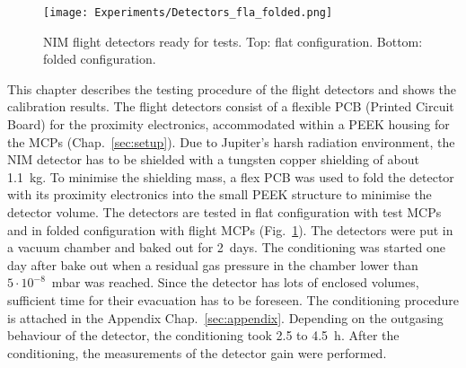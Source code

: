 	\begin{figure}[h] %
		\centering
		\texttt{[image: Experiments/Detectors\_fla\_folded.png]}
		\caption{NIM flight detectors ready for tests. Top: flat configuration. Bottom: folded configuration.}
		\label{fig:DetFlatFolded}
	\end{figure}
	This chapter describes the testing procedure of the flight detectors and shows the calibration results. The flight detectors consist of a flexible PCB (Printed Circuit Board) for the proximity electronics, accommodated within a PEEK housing for the MCPs (Chap.~\ref{sec:setup}). Due to Jupiter's harsh radiation environment, the NIM detector has to be shielded with a tungsten copper shielding of about 1.1~kg. To minimise the shielding mass, a flex PCB was used to fold the detector with its proximity electronics into the small PEEK structure to minimise the detector volume. The detectors are tested in flat configuration with test MCPs and in folded configuration with flight MCPs (Fig.~\ref{fig:DetFlatFolded}). The detectors were put in a vacuum chamber and baked out for 2~days. The conditioning was started one day after bake out when a residual gas pressure in the chamber lower than $5\cdot10^{-8}$~mbar was reached. Since the detector has lots of enclosed volumes, sufficient time for their evacuation has to be foreseen. The conditioning procedure is attached in the Appendix Chap.~\ref{sec:appendix}. Depending on the outgasing behaviour of the detector, the conditioning took 2.5 to 4.5~h. After the conditioning, the measurements of the detector gain were performed.\\
